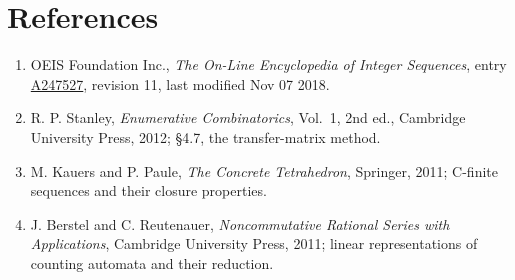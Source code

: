 \documentclass[11pt]{article}
\theoremstyle{definition}
\begin{document}
\section{References}

\begin{enumerate}

\item OEIS Foundation Inc., \emph{The On-Line Encyclopedia of Integer Sequences}, entry \href{https://oeis.org/A247527}{A247527}, revision 11, last modified Nov 07 2018.

\item R. P. Stanley, \emph{Enumerative Combinatorics}, Vol.~1, 2nd ed., Cambridge University Press, 2012; \S4.7, the transfer-matrix method.

\item M. Kauers and P. Paule, \emph{The Concrete Tetrahedron}, Springer, 2011; C-finite sequences and their closure properties.

\item J. Berstel and C. Reutenauer, \emph{Noncommutative Rational Series with Applications}, Cambridge University Press, 2011; linear representations of counting automata and their reduction.

\end{enumerate}
\end{document}
